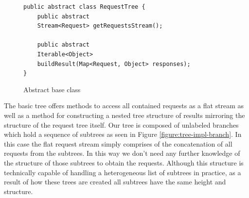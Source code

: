 \begin{figure}

\begin{verbatim}
public abstract class RequestTree {
    public abstract 
    Stream<Request> getRequestsStream();

    public abstract 
    Iterable<Object> 
    buildResult(Map<Request, Object> responses);
}
\end{verbatim}
\caption{Abstract base class}
\label{figure:tree-impl-base-class}

\end{figure}

The basic tree offers methods to access all contained requests as a flat stream as well as a method for constructing a nested tree structure of results mirroring the structure of the request tree itself.
Our tree is composed of unlabeled branches which hold a sequence of subtrees as seen in Figure \ref{figure:tree-impl-branch}.
In this case the flat request stream simply comprises of the concatenation of all requests from the subtrees.
In this way we don't need any further knowledge of the structure of those subtrees to obtain the requests.
Although this structure is technically capable of handling a heterogeneous list of subtrees in practice, as a result of how these trees are created all subtrees have the same height and structure.

